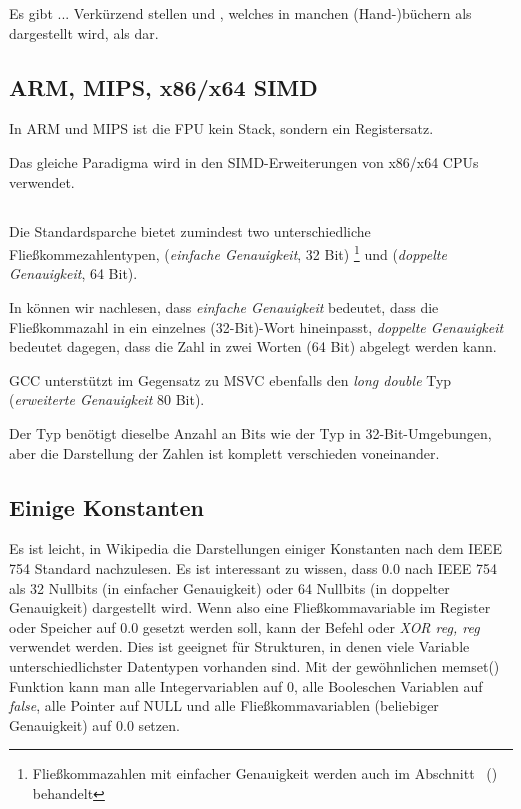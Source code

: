 Es gibt ... Verkürzend stellen \IDA und \olly {}, welches in
manchen (Hand-)büchern als  dargestellt wird, als  dar.

\subsection{ARM, MIPS, x86/x64 SIMD}
In ARM und MIPS ist die FPU kein Stack, sondern ein Registersatz.

Das gleiche Paradigma wird in den SIMD-Erweiterungen von x86/x64 CPUs verwendet.

\subsection{\CCpp}

Die Standardsparche \CCpp bietet zumindest two unterschiedliche
Fließkommezahlentypen, \Tfloat (\emph{einfache Genauigkeit}, 32 Bit)
\footnote{Fließkommazahlen mit einfacher Genauigkeit werden auch im Abschnitt
\emph{\WorkingWithFloatAsWithStructSubSubSectionName}~()
behandelt} und \Tdouble (\emph{doppelte Genauigkeit}, 64 Bit).

In  können wir nachlesen, dass \emph{einfache
Genauigkeit} bedeutet, dass die Fließkommazahl in ein einzelnes (32-Bit)-Wort
hineinpasst, \emph{doppelte Genauigkeit} bedeutet dagegen, dass die Zahl in zwei
Worten (64 Bit) abgelegt werden kann.

GCC unterstützt im Gegensatz zu MSVC ebenfalls den \emph{long double} Typ
(\emph{erweiterte Genauigkeit} 80 Bit).

Der \Tfloat Typ benötigt dieselbe Anzahl an Bits wie der \Tint Typ in
32-Bit-Umgebungen, aber die Darstellung der Zahlen ist komplett verschieden
voneinander.





\subsection{Einige Konstanten}
Es ist leicht, in Wikipedia die Darstellungen einiger Konstanten nach dem IEEE
754 Standard nachzulesen. Es ist interessant zu wissen, dass 0.0 nach IEEE 754
als 32 Nullbits (in einfacher Genauigkeit) oder 64 Nullbits (in doppelter
Genauigkeit) dargestellt wird.
Wenn also eine Fließkommavariable im Register oder Speicher auf 0.0 gesetzt
werden soll, kann der Befehl \MOV oder \emph{XOR reg, reg} verwendet werden.
Dies ist geeignet für Strukturen, in denen viele Variable unterschiedlichster
Datentypen vorhanden sind. Mit der gewöhnlichen memset() Funktion kann man alle
Integervariablen auf 0, alle Booleschen Variablen auf \emph{false}, alle Pointer
auf NULL und alle Fließkommavariablen (beliebiger Genauigkeit) auf 0.0 setzen.


